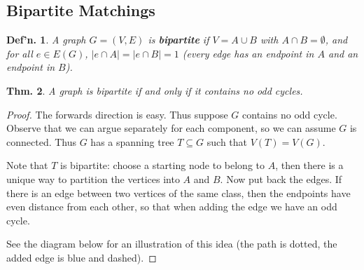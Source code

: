 \documentclass[12pt, a4paper]{book}
\newtheorem{theorem}{Thm.}[section]
\newtheorem{definition}[theorem]{Def'n.}
\theoremstyle{nonumberplain}
\newtheorem{proof}{Proof}
\begin{document}
\subsection{Bipartite Matchings}
\begin{definition}
    A graph $G=(V,E)$ is \textbf{bipartite} if $V=A\cup B$ with $A\cap B=\emptyset$, and for all $e\in E(G)$, $|e\cap A|=|e\cap B|=1$ (every edge has an endpoint in $A$ and an endpoint in $B$).
\end{definition}
\begin{theorem}
    A graph is bipartite if and only if it contains no odd cycles.
\end{theorem}
\begin{proof}
    The forwards direction is easy.
    Thus suppose $G$ contains no odd cycle.
    Observe that we can argue separately for each component, so we can assume $G$ is connected.
    Thus $G$ has a spanning tree $T\subseteq G$ such that $V(T)=V(G)$.

    Note that $T$ is bipartite: choose a starting node to belong to $A$, then there is a unique way to partition the vertices into $A$ and $B$.
    Now put back the edges.
    If there is an edge between two vertices of the same class, then the endpoints have even distance from each other, so that when adding the edge we have an odd cycle.

    See the diagram below for an illustration of this idea (the path is dotted, the added edge is blue and dashed).
\end{proof}
\begin{center}
\end{center}
\end{document}
